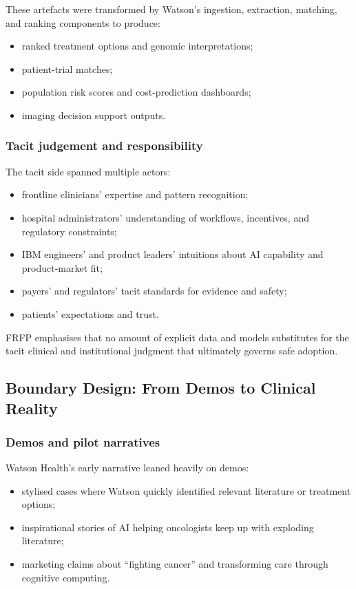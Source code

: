 These artefacts were transformed by Watson’s ingestion, extraction, matching,
and ranking components to produce:

\begin{itemize}
  \item ranked treatment options and genomic interpretations;
  \item patient-trial matches;
  \item population risk scores and cost-prediction dashboards;
  \item imaging decision support outputs.
\end{itemize}

\subsubsection*{Tacit judgement and responsibility}

The tacit side spanned multiple actors:

\begin{itemize}
  \item frontline clinicians’ expertise and pattern recognition;
  \item hospital administrators’ understanding of workflows, incentives,
        and regulatory constraints;
  \item IBM engineers’ and product leaders’ intuitions about AI capability
        and product-market fit;
  \item payers’ and regulators’ tacit standards for evidence and safety;
  \item patients’ expectations and trust.
\end{itemize}

FRFP emphasises that no amount of explicit data and models substitutes for the
tacit clinical and institutional judgment that ultimately governs safe adoption.


\subsection{Boundary Design: From Demos to Clinical Reality}

\subsubsection*{Demos and pilot narratives}

Watson Health’s early narrative leaned heavily on demos:

\begin{itemize}
  \item stylised cases where Watson quickly identified relevant literature or
        treatment options;
  \item inspirational stories of AI helping oncologists keep up with
        exploding literature;
  \item marketing claims about ``fighting cancer'' and transforming care
        through cognitive computing.
\end{itemize}

